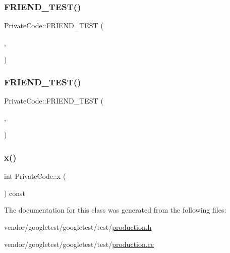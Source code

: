 \subsubsection{\texorpdfstring{F\+R\+I\+E\+N\+D\+\_\+\+T\+E\+S\+T()}{FRIEND\_TEST()}\hspace{0.1cm}{\footnotesize\ttfamily [1/2]}}
{\footnotesize\ttfamily Private\+Code\+::\+F\+R\+I\+E\+N\+D\+\_\+\+T\+E\+ST (\begin{DoxyParamCaption}\item[{Private\+Code\+Test}]{,  }\item[{Can\+Access\+Private\+Members}]{ }\end{DoxyParamCaption})}

\mbox{\label{class_private_code_a29b6823300f68d78691476eeeaed8a7c}} 
\subsubsection{\texorpdfstring{F\+R\+I\+E\+N\+D\+\_\+\+T\+E\+S\+T()}{FRIEND\_TEST()}\hspace{0.1cm}{\footnotesize\ttfamily [2/2]}}
{\footnotesize\ttfamily Private\+Code\+::\+F\+R\+I\+E\+N\+D\+\_\+\+T\+E\+ST (\begin{DoxyParamCaption}\item[{\hyperlink{gtest__prod__test_8cc_a89debba10c803e339ce0f9b0b34a2267}{Private\+Code\+Fixture\+Test}}]{,  }\item[{Can\+Access\+Private\+Members}]{ }\end{DoxyParamCaption})}

\mbox{\label{class_private_code_a247781246ce4d0c66563eaa39ba5aaa9}} 
\subsubsection{\texorpdfstring{x()}{x()}}
{\footnotesize\ttfamily int Private\+Code\+::x (\begin{DoxyParamCaption}{ }\end{DoxyParamCaption}) const\hspace{0.3cm}{\ttfamily [inline]}}



The documentation for this class was generated from the following files\+:\begin{DoxyCompactItemize}
\item 
vendor/googletest/googletest/test/\hyperlink{production_8h}{production.\+h}\item 
vendor/googletest/googletest/test/\hyperlink{production_8cc}{production.\+cc}\end{DoxyCompactItemize}
